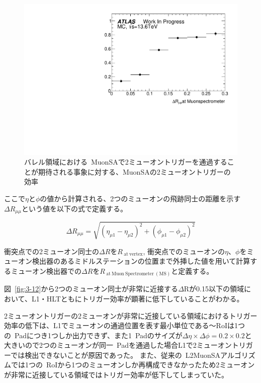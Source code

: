 \begin{figure}[H]
    \centering
    \includegraphics[clip, width=13cm]{fig/3/2mu14_MC.pdf}
    \caption{バレル領域における~MuonSAで2ミューオントリガーを通過することが期待される事象に対する、MuonSAの2ミューオントリガーの効率}
    \label{fig:3-13}
\end{figure}

ここで$\eta$と$\phi$の値から計算される、2つのミューオンの飛跡同士の距離を示す$\Delta R_{\mu\mu}$という値を以下の式で定義する。

\begin{equation}
    \Delta R_{\mu \mu}=\sqrt{\left(\eta_{\mu 1}-\eta_{\mu 2}\right)^2+\left(\phi_{\mu 1}-\phi_{\mu 2}\right)^2}
\end{equation}

衝突点での2ミューオン同士の$\Delta R$を$R_{\mathrm{~at~vertex}}$, 衝突点でのミューオンの$\eta$、$\phi$をミューオン検出器のあるミドルステーションの位置まで外挿した値を用いて計算するミューオン検出器での$\Delta R$を$R_{\mathrm{~at~Muon~Spectrometer~(MS)}}$と定義する。

図~\ref{fig:3-12}から2つのミューオン同士が非常に近接する$\Delta \mathrm{R}$が0.15以下の領域において、L1・HLTともにトリガー効率が顕著に低下していることがわかる。

2ミューオントリガーの2ミューオンが非常に近接している領域におけるトリガー効率の低下は、L1でミューオンの通過位置を表す最小単位である～RoIは1つの~Padにつき1つしか出力できず、また1~Padのサイズが$\Delta\eta\times\Delta\phi=0.2\times0.2$と大きいので2つのミューオンが同一~Padを通過した場合L1で2ミューオントリガーでは検出できないことが原因であった。
また、従来の~L2MuonSAアルゴリズムでは1つの~RoIから1つのミューオンしか再構成できなかったため2ミューオンが非常に近接している領域ではトリガー効率が低下してしまっていた。

